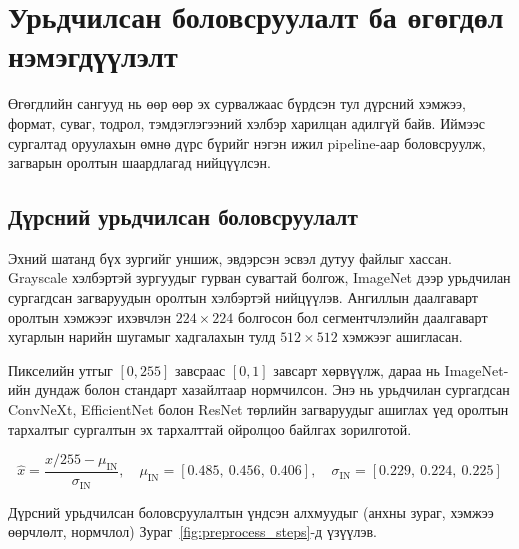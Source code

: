 \section{Урьдчилсан боловсруулалт ба өгөгдөл нэмэгдүүлэлт}

Өгөгдлийн сангууд нь өөр өөр эх сурвалжаас бүрдсэн тул дүрсний хэмжээ, формат, суваг, тодрол, тэмдэглэгээний хэлбэр харилцан адилгүй байв. Иймээс сургалтад оруулахын өмнө дүрс бүрийг нэгэн ижил pipeline-аар боловсруулж, загварын оролтын шаардлагад нийцүүлсэн.

\subsection*{Дүрсний урьдчилсан боловсруулалт}

Эхний шатанд бүх зургийг уншиж, эвдэрсэн эсвэл дутуу файлыг хассан. Grayscale хэлбэртэй зургуудыг гурван сувагтай болгож, ImageNet дээр урьдчилан сургагдсан загваруудын оролтын хэлбэртэй нийцүүлэв. Ангиллын даалгаварт оролтын хэмжээг ихэвчлэн $224\times224$ болгосон бол сегментчлэлийн даалгаварт хугарлын нарийн шугамыг хадгалахын тулд $512\times512$ хэмжээг ашигласан.

Пикселийн утгыг $[0,255]$ завсраас $[0,1]$ завсарт хөрвүүлж, дараа нь ImageNet-ийн дундаж болон стандарт хазайлтаар нормчилсон. Энэ нь урьдчилан сургагдсан ConvNeXt, EfficientNet болон ResNet төрлийн загваруудыг ашиглах үед оролтын тархалтыг сургалтын эх тархалттай ойролцоо байлгах зорилготой.

\begin{equation}
    \hat{x} = \frac{x/255 - \mu_{\text{IN}}}{\sigma_{\text{IN}}}, \quad
    \mu_{\text{IN}} = [0.485,\ 0.456,\ 0.406], \quad
    \sigma_{\text{IN}} = [0.229,\ 0.224,\ 0.225]
\end{equation}

Дүрсний урьдчилсан боловсруулалтын үндсэн алхмуудыг (анхны зураг, хэмжээ өөрчлөлт, нормчлол) Зураг~\ref{fig:preprocess_steps}-д үзүүлэв.

